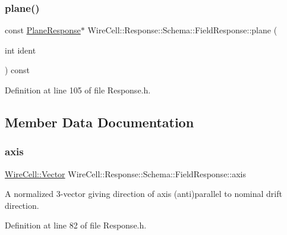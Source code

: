 \subsubsection{\texorpdfstring{plane()}{plane()}\hspace{0.1cm}{\footnotesize\ttfamily [2/2]}}
{\footnotesize\ttfamily const \hyperlink{struct_wire_cell_1_1_response_1_1_schema_1_1_plane_response}{Plane\+Response}$\ast$ Wire\+Cell\+::\+Response\+::\+Schema\+::\+Field\+Response\+::plane (\begin{DoxyParamCaption}\item[{int}]{ident }\end{DoxyParamCaption}) const\hspace{0.3cm}{\ttfamily [inline]}}



Definition at line 105 of file Response.\+h.



\subsection{Member Data Documentation}
\mbox{\label{struct_wire_cell_1_1_response_1_1_schema_1_1_field_response_acae15775cad08bcffe0712dd65d1ff09}} 
\subsubsection{\texorpdfstring{axis}{axis}}
{\footnotesize\ttfamily \hyperlink{namespace_wire_cell_aa3c82d3ba85f032b0d278b7004846800}{Wire\+Cell\+::\+Vector} Wire\+Cell\+::\+Response\+::\+Schema\+::\+Field\+Response\+::axis}

A normalized 3-\/vector giving direction of axis (anti)parallel to nominal drift direction. 

Definition at line 82 of file Response.\+h.

\mbox{\label{struct_wire_cell_1_1_response_1_1_schema_1_1_field_response_aadaa425d6a5c65ed739a3f3b5f53cdbb}} 
